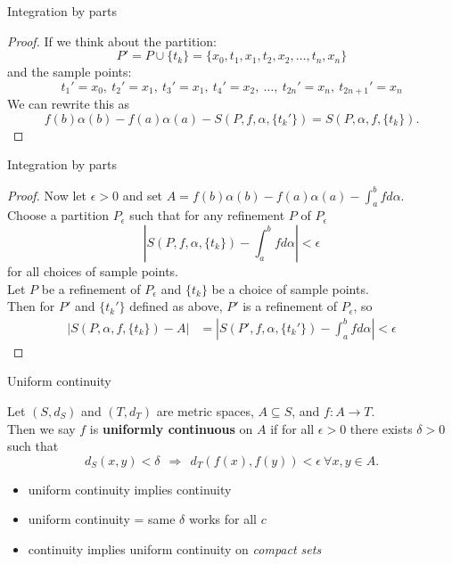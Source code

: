 \documentclass{beamer}
\begin{document}
\begin{frame}{Integration by parts}
\begin{proof}
If we think about the partition:
$$P' = P\cup\{t_k\} = \{x_0,t_1,x_1,t_2,x_2,\dots, t_n,x_n\}$$
\pause
and the sample points:
$$t_1'=x_0,\ t_2'=x_1,\ t_3'=x_1,\ t_4'=x_2,\ \dots,\ t_{2n}'=x_n,\ t_{2n+1}'=x_n$$
\pause
We can rewrite this as
$$f(b)\alpha(b)-f(a)\alpha(a)-S(P,f,\alpha,\{t_k'\}) = S(P,\alpha,f,\{t_k\}).$$
\end{proof}
\end{frame}

\begin{frame}{Integration by parts}
\begin{proof}
\pause
Now let $\epsilon > 0$ and set $A = f(b)\alpha(b)-f(a)\alpha(a)-\int_a^bf d\alpha$.\\
\pause
Choose a partition $P_\epsilon$ such that for any refinement $P$ of $P_\epsilon$
$$\left| S(P,f,\alpha,\{t_k\})-\int_a^b fd\alpha \right| < \epsilon$$
for all choices of sample points.\\
\pause
Let $P$ be a refinement of $P_\epsilon$ and $\{t_k\}$ be a choice of sample points.\\
\pause
Then for $P'$ and $\{t_k'\}$ defined as above, $P'$ is a refinement of $P_\epsilon$, so
\begin{align*}
|S(P,\alpha,f,\{t_k\})-A|
&= \left|S(P',f,\alpha,\{t_k'\})-\int_a^bf d\alpha\right| < \epsilon
\end{align*}
\end{proof}
\end{frame}

\begin{frame}{Uniform continuity}
\begin{defn}
Let $(S,d_S)$ and $(T,d_T)$ are metric spaces, $A\subseteq S$, and $f: A\rightarrow T$.\\
\pause
Then we say $f$ is \textbf{uniformly continuous} on $A$ if for all $\epsilon > 0$ there exists $\delta > 0$ such that
$$d_S(x,y) < \delta\ \ \Rightarrow\ \ d_T(f(x),f(y)) < \epsilon\ \forall x,y\in A.$$
\end{defn}
\begin{itemize}
\pause
\item uniform continuity implies continuity
\pause
\item uniform continuity = same $\delta$ works for all $c$
\pause
\item continuity implies uniform continuity on \emph{compact sets}
\end{itemize}
\end{frame}
\end{document}
